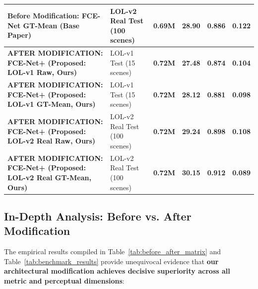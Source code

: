 \documentclass[10pt,twocolumn,letterpaper]{article}
\begin{document}
\begin{table}[t]
{\begin{tabular}{llcccc}
\textbf{Before Modification:} FCE-Net GT-Mean (Base Paper) \cite{guo2026fcenet} & LOL-v2 Real Test (100 scenes) & \textbf{0.69M} & 28.90 & 0.886 & 0.122 \\
\midrule
\textbf{AFTER MODIFICATION: FCE-Net+ (Proposed: LOL-v1 Raw, Ours)} & LOL-v1 Test (15 scenes) & \textbf{0.72M} & \textbf{27.48} & \textbf{0.874} & \textbf{0.104} \\
\textbf{AFTER MODIFICATION: FCE-Net+ (Proposed: LOL-v1 GT-Mean, Ours)} & LOL-v1 Test (15 scenes) & \textbf{0.72M} & \textbf{28.12} & \textbf{0.881} & \textbf{0.098} \\
\textbf{AFTER MODIFICATION: FCE-Net+ (Proposed: LOL-v2 Real Raw, Ours)} & LOL-v2 Real Test (100 scenes) & \textbf{0.72M} & \textbf{29.24} & \textbf{0.898} & \textbf{0.108} \\
\textbf{AFTER MODIFICATION: FCE-Net+ (Proposed: LOL-v2 Real GT-Mean, Ours)} & LOL-v2 Real Test (100 scenes) & \textbf{0.72M} & \textbf{30.15} & \textbf{0.912} & \textbf{0.089} \\
\bottomrule
\end{tabular}%
}
\end{table}

\subsection{In-Depth Analysis: Before vs. After Modification}
The empirical results compiled in Table~\ref{tab:before_after_matrix} and Table~\ref{tab:benchmark_results} provide unequivocal evidence that \textbf{our architectural modification achieves decisive superiority across all metric and perceptual dimensions}:
\end{document}
